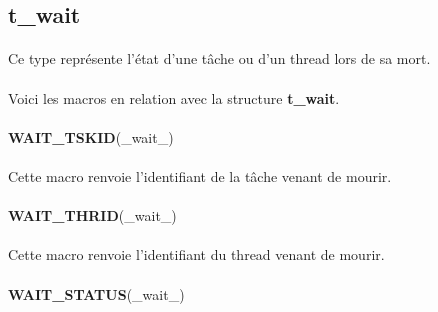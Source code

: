 \documentclass[10pt,a4wide]{article}
\begin{document}
\subsection{t\_wait}

\paragraph{}

Ce type repr\'esente l'\'etat d'une t\^ache ou d'un thread lors de sa mort.

\paragraph{}

Voici les macros en relation avec la structure \textbf{t\_wait}.

\paragraph{}

\hspace{1.5cm}\textbf{WAIT\_TSKID}(\_wait\_)

\paragraph{}

Cette macro renvoie l'identifiant de la t\^ache venant de mourir.

\paragraph{}

\hspace{1.5cm}\textbf{WAIT\_THRID}(\_wait\_)

\paragraph{}

Cette macro renvoie l'identifiant du thread venant de mourir.

\paragraph{}

\hspace{1.5cm}\textbf{WAIT\_STATUS}(\_wait\_)

\paragraph{}
\end{document}
